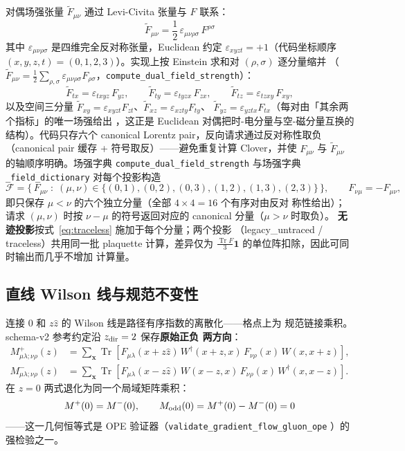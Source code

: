 \documentclass[11pt,a4paper]{ctexart}
\newcommand{\Ftmunu}{\tilde{F}_{\mu\nu}}
\newcommand{\eps}{\varepsilon}
\newcommand{\tr}{\operatorname{Tr}}
\newcommand{\Tr}{\operatorname{Tr}}
\newcommand{\code}[1]{\texttt{#1}}
\begin{document}
对偶场强张量 $\Ftmunu$ 通过 Levi-Civita 张量与 $F$ 联系：
\begin{equation}\label{eq:dual_F}
\Ftmunu = \frac{1}{2}\,\eps_{\mu\nu\rho\sigma}\,F^{\rho\sigma}
\end{equation}
其中 $\eps_{\mu\nu\rho\sigma}$ 是四维完全反对称张量，Euclidean 约定
$\eps_{xyzt}=+1$（代码坐标顺序 $(x,y,z,t)=(0,1,2,3)$）。实现上按
Einstein 求和对 $(\rho,\sigma)$ 逐分量缩并
（$\tilde F_{\mu\nu}=\frac12\sum_{\rho,\sigma}\eps_{\mu\nu\rho\sigma}
F_{\rho\sigma}$，\code{compute\_dual\_field\_strength}）：
\begin{equation}
\tilde F_{tx} = \eps_{txyz}\,F_{yz}, \qquad
\tilde F_{ty} = \eps_{tyzx}\,F_{zx}, \qquad
\tilde F_{tz} = \eps_{tzxy}\,F_{xy},
\end{equation}
以及空间三分量
$\tilde F_{xy}=\eps_{xyzt}F_{zt}$、$\tilde F_{xz}=\eps_{xzty}F_{ty}$、
$\tilde F_{yz}=\eps_{yztx}F_{tx}$（每对由「其余两个指标」的唯一场强给出
，这正是 Euclidean 对偶把时-电分量与空-磁分量互换的结构）。代码只存六个
canonical Lorentz pair，反向请求通过反对称性取负
（canonical pair 缓存 + 符号取反）——避免重复计算
Clover，并使 $F_{\mu\nu}$ 与 $\Ftmunu$ 的轴顺序明确。场强字典
\code{compute\_dual\_field\_strength} 与场强字典
\code{\_field\_dictionary} 对每个投影构造
\begin{equation}
\mathcal{F} = \bigl\{\,F_{\mu\nu}\;:\;(\mu,\nu)\in
\{(0,1),(0,2),(0,3),(1,2),(1,3),(2,3)\}\,\bigr\},
\qquad F_{\nu\mu} = -F_{\mu\nu},
\end{equation}
即只保存 $\mu<\nu$ 的六个独立分量（全部 $4\times4=16$ 个有序对由反对
称性给出）；请求 $(\mu,\nu)$ 时按 $\nu-\mu$ 的符号返回对应的 canonical
分量（$\mu>\nu$ 时取负）。
\textbf{无迹投影}按式~\eqref{eq:traceless} 施加于每个分量；两个投影
（legacy\_untraced / traceless）共用同一批 plaquette 计算，差异仅为
$\frac{\tr F}{3}\mathbf 1$ 的单位阵扣除，因此可同时输出而几乎不增加
计算量。

\subsection{直线 Wilson 线与规范不变性}
\label{sec:wilson-line}

连接 $0$ 和 $z\hat z$ 的 Wilson 线是路径有序指数的离散化——格点上为
规范链接乘积。schema-v2 参考约定沿 $z_{\rm dir}=2$ 保存\textbf{原始正负
两方向}：
\begin{align}
M_{\mu\lambda;\nu\rho}^{+}(z)
&=\sum_{\boldsymbol x}
\Tr\!\left[
F_{\mu\lambda}(x+z\hat z)\,W^\dagger(x+z,x)\,
F_{\nu\rho}(x)\,W(x,x+z)
\right], \label{eq:bilocal-plus}\\
M_{\mu\lambda;\nu\rho}^{-}(z)
&=\sum_{\boldsymbol x}
\Tr\!\left[
F_{\mu\lambda}(x-z\hat z)\,W(x-z,x)\,
F_{\nu\rho}(x)\,W^\dagger(x,x-z)
\right]. \label{eq:bilocal-minus}
\end{align}
在 $z=0$ 两式退化为同一个局域矩阵乘积：
\begin{equation}
M^+(0)=M^-(0), \qquad
M_{\rm odd}(0)=M^+(0)-M^-(0)=0
\end{equation}
——这一几何恒等式是 OPE 验证器（\code{validate\_gradient\_flow\_gluon\_ope}
）的强检验之一。
\end{document}

